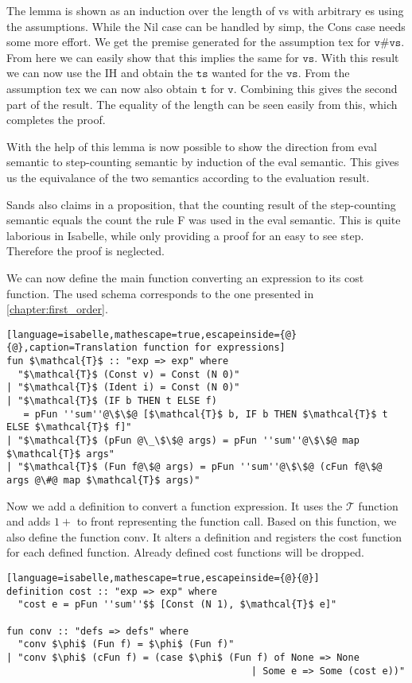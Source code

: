 The lemma is shown as an induction over the length of vs with arbitrary es using the assumptions.
While the Nil case can be handled by simp, the Cons case needs some more effort.
We get the premise generated for the assumption tex for $\texttt{v\#vs}$.
From here we can easily show that this implies the same for $\texttt{vs}$.
With this result we can now use the IH and obtain the $\texttt{ts}$ wanted for the $\texttt{vs}$.
From the assumption tex we can now also obtain $\texttt{t}$ for $\texttt{v}$.
Combining this gives the second part of the result.
The equality of the length can be seen easily from this, which completes the proof.

With the help of this lemma is now possible to show the direction from eval semantic to step-counting semantic by induction of the eval semantic.
This gives us the equivalance of the two semantics according to the evaluation result.

Sands also claims in a proposition, that the counting result of the step-counting semantic equals the count the rule F was used in the eval semantic.
This is quite laborious in Isabelle, while only providing a proof for an easy to see step.
Therefore the proof is neglected.

We can now define the main function converting an expression to its cost function.
The used schema corresponds to the one presented in \ref{chapter:first_order}.
\begin{lstlisting}[language=isabelle,mathescape=true,escapeinside={@}{@},caption=Translation function for expressions]
fun $\mathcal{T}$ :: "exp => exp" where
  "$\mathcal{T}$ (Const v) = Const (N 0)"
| "$\mathcal{T}$ (Ident i) = Const (N 0)"
| "$\mathcal{T}$ (IF b THEN t ELSE f)
   = pFun ''sum''@\$\$@ [$\mathcal{T}$ b, IF b THEN $\mathcal{T}$ t ELSE $\mathcal{T}$ f]"
| "$\mathcal{T}$ (pFun @\_\$\$@ args) = pFun ''sum''@\$\$@ map $\mathcal{T}$ args"
| "$\mathcal{T}$ (Fun f@\$@ args) = pFun ''sum''@\$\$@ (cFun f@\$@ args @\#@ map $\mathcal{T}$ args)"
\end{lstlisting}

Now we add a definition to convert a function expression.
It uses the $\mathcal{T}$ function and adds $1+$ to front representing the function call.
Based on this function, we also define the function conv.
It alters a definition and registers the cost function for each defined function.
Already defined cost functions will be dropped.
\begin{lstlisting}[language=isabelle,mathescape=true,escapeinside={@}{@}]
definition cost :: "exp => exp" where
  "cost e = pFun ''sum''$$ [Const (N 1), $\mathcal{T}$ e]"

fun conv :: "defs => defs" where
  "conv $\phi$ (Fun f) = $\phi$ (Fun f)"
| "conv $\phi$ (cFun f) = (case $\phi$ (Fun f) of None => None
                                           | Some e => Some (cost e))"
\end{lstlisting}

